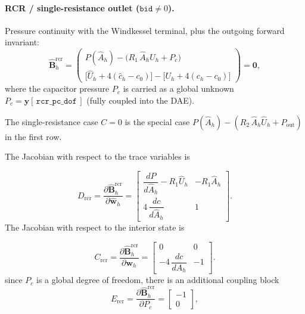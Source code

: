 \documentclass[11pt]{article}
\begin{document}
\paragraph{RCR / single-resistance outlet ($\mathtt{bid}\neq0$).} Pressure
continuity with the Windkessel terminal, plus the outgoing forward invariant:
\begin{equation}
  \widehat{\mathbf B}_h^{\mathrm{rcr}}
  =
  \begin{pmatrix}
  P(\widehat A_h) - \bigl(R_1\,\widehat A_h\widehat U_h + P_c\bigr)\\[6pt]
  \bigl[\widehat U_h+4(\widehat c_h-c_0)\bigr]
  -\bigl[U_h+4(c_h-c_0)\bigr]
  \end{pmatrix}
  =\mathbf 0 ,
  \label{eq:bc_rcr}
\end{equation}
where the capacitor pressure $P_c$ is carried as a global unknown
$P_c=\mathbf y[\,\texttt{rcr\_pc\_dof}\,]$ (fully coupled into the DAE). 

The
single-resistance case $C=0$ is the special case $P(\widehat A_h)-(R_2\,\widehat
A_h\widehat U_h+P_{\mathrm{out}})$ in the first row.

The Jacobian with respect to the trace variables is

\begin{equation}
D_{\mathrm{rcr}}
=
\frac{\partial \widehat{\mathbf B}_h^{\mathrm{rcr}}}
     {\partial \widehat{\mathbf w}_h}
=
\begin{bmatrix}
\dfrac{dP}{d\widehat A_h}
-
R_1\widehat U_h
&
-
R_1\widehat A_h
\\[10pt]
4\,\dfrac{dc}{d\widehat A_h}
&
1
\end{bmatrix}.
\label{eq:Drcr}
\end{equation}
The Jacobian with respect to the interior state is

\begin{equation}
C_{\mathrm{rcr}}
=
\frac{\partial \widehat{\mathbf B}_h^{\mathrm{rcr}}}
     {\partial \mathbf w_h}
=
\begin{bmatrix}
0 & 0
\\[8pt]
-4\,\dfrac{dc}{dA_h}
&
-1
\end{bmatrix}.
\label{eq:Brcr}
\end{equation}
since $P_c$ is a global degree of freedom, there is an additional coupling block
\begin{equation}
E_{\mathrm{rcr}}
=
\frac{\partial \widehat{\mathbf B}_h^{\mathrm{rcr}}}
     {\partial P_c}
=
\begin{bmatrix}
-1
\\[4pt]
0
\end{bmatrix},
\label{eq:Ercr}
\end{equation}
\end{document}
